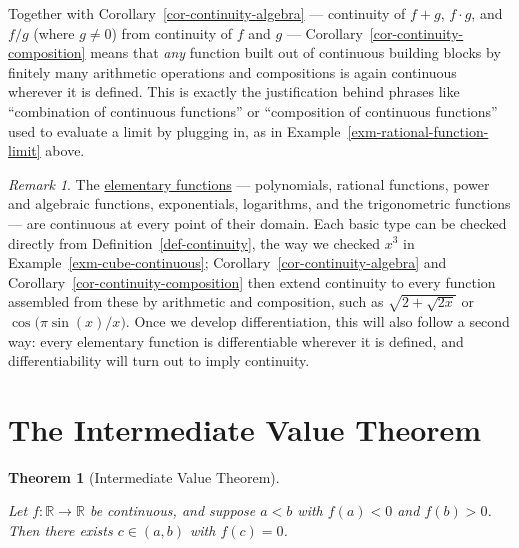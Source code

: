 \documentclass[
  letterpaper,
  DIV=11,
  numbers=noendperiod]{scrreprt}
\theoremstyle{plain}
\theoremstyle{plain}
\theoremstyle{definition}
\theoremstyle{definition}
\theoremstyle{definition}
\theoremstyle{plain}
\newtheorem{theorem}{Theorem}[chapter]
\theoremstyle{plain}
\theoremstyle{remark}
\newtheorem{refremark}{Remark}[chapter]
\begin{document}
Together with Corollary~\ref{cor-continuity-algebra} --- continuity of
\(f+g\), \(f\cdot g\), and \(f/g\) (where \(g\neq0\)) from continuity of
\(f\) and \(g\) --- Corollary~\ref{cor-continuity-composition} means
that \emph{any} function built out of continuous building blocks by
finitely many arithmetic operations and compositions is again continuous
wherever it is defined. This is exactly the justification behind phrases
like ``combination of continuous functions'' or ``composition of
continuous functions'' used to evaluate a limit by plugging in, as in
Example~\ref{exm-rational-function-limit} above.

\begin{refremark}
The \hyperref[the-elementary-functions]{elementary functions} ---
polynomials, rational functions, power and algebraic functions,
exponentials, logarithms, and the trigonometric functions --- are
continuous at every point of their domain. Each basic type can be
checked directly from Definition~\ref{def-continuity}, the way we
checked \(x^3\) in Example~\ref{exm-cube-continuous};
Corollary~\ref{cor-continuity-algebra} and
Corollary~\ref{cor-continuity-composition} then extend continuity to
every function assembled from these by arithmetic and composition, such
as \(\sqrt{2+\sqrt{2x}}\) or \(\cos\!\big(\pi\sin(x)/x\big)\). Once we
develop differentiation, this will also follow a second way: every
elementary function is differentiable wherever it is defined, and
differentiability will turn out to imply continuity.

\label{rem-elementary-continuous}

\end{refremark}

\section{The Intermediate Value
Theorem}\label{the-intermediate-value-theorem}

\begin{theorem}[Intermediate Value
Theorem]\protect\hypertarget{thm-ivt}{}\label{thm-ivt}

Let \(f\colon\mathbb{R}\to\mathbb{R}\) be continuous, and suppose
\(a<b\) with \(f(a)<0\) and \(f(b)>0\). Then there exists \(c\in(a,b)\)
with \(f(c)=0\).

\end{theorem}
\end{document}
